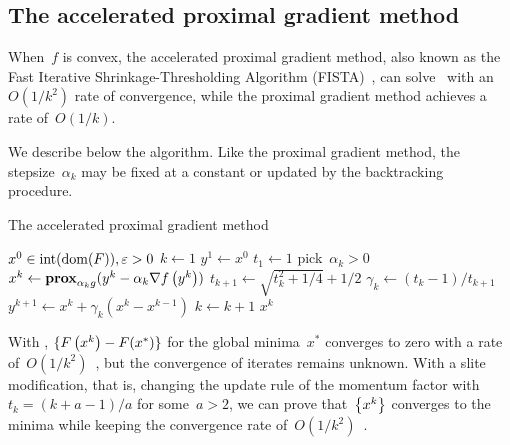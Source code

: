 \documentclass[../../main]{subfiles}
\begin{document}
\subsection{The accelerated proximal gradient method} 
When~$f$ is convex, the accelerated proximal gradient method, also known as the Fast Iterative Shrinkage-Thresholding Algorithm (FISTA)~\cite{Beck2009}, can solve~ with an~$O(1 / k^2)$ rate of convergence, while the proximal gradient method achieves a rate of~$O(1 / k)$.

We describe below the algorithm.
Like the proximal gradient method, the stepsize~$\alpha_k$ may be fixed at a constant or updated by the backtracking procedure.
\begin{algorithm}[hbtp]
    \caption{The accelerated proximal gradient method}
    \begin{algorithmic}[1]
        \Require $x^0 \in \interior (\dom (F)), \varepsilon > 0$
        \State $k \gets 1$
        \State $y^1 \gets x^0$
        \State $t_1 \gets 1$
        \Repeat
        \State pick~$\alpha_k > 0$
        \State $x^k \gets \prox_{\alpha_k g}(y^k - \alpha_k \nabla f\left(y^k\right))$
        \State $t_{k + 1} \gets \sqrt{t_k^2 + 1 / 4} + 1 / 2$
        \State $\gamma_k \gets (t_k - 1) / t_{k + 1}$
        \State $y^{k + 1} \gets x^k + \gamma_k (x^k - x^{k - 1})$
        \State $k \gets k + 1$
        \State \Return $x^k$
    \end{algorithmic}
\end{algorithm}

With , $\set{F\left(x^k\right) - F(x^\ast)}$ for the global minima~$x^\ast$ converges to zero with a rate of~$O(1 / k^2)$~\cite{Beck2009}, but the convergence of iterates remains unknown.
With a slite modification, that is, changing the update rule of the momentum factor with~$t_k = (k + a - 1) / a$ for some~$a > 2$, we can prove that~$\set*{x^k}$ converges to the minima while keeping the convergence rate of~$O(1 / k^2)$~\cite{Chambolle2015}.
\end{document}
